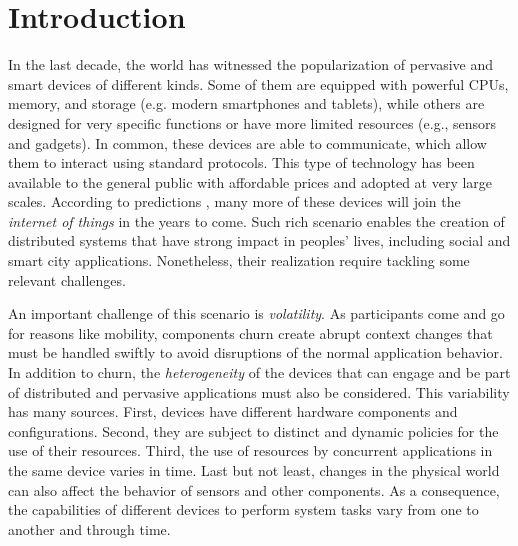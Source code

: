 \section{Introduction}
\label{sec:intro}


In the last decade, the world has witnessed the popularization of pervasive and smart devices of different kinds. Some of them are equipped with powerful CPUs, memory, and storage (e.g. modern smartphones and tablets), while others are designed for very specific functions or have more limited resources (e.g., sensors and gadgets). In common, these devices are able to communicate, which allow them to interact using standard protocols. This type of technology has been available to the general public with affordable prices and adopted at very large scales. According to predictions \cite{CITATION}, many more of these devices will join the \textit{internet of things} in the years to come. Such rich scenario enables the creation of distributed systems that have strong impact in peoples' lives, including social and smart city applications. Nonetheless, their realization require tackling some relevant challenges.


An important challenge of this scenario is \textit{volatility}. As participants come and go for reasons like mobility, components churn create abrupt context changes that must be handled swiftly to avoid disruptions of the normal application behavior. 
In addition to churn, the \textit{heterogeneity} of the devices that can engage and be part of distributed and pervasive applications must also be considered. This variability has many sources. First, devices have different hardware components and configurations. Second, they are subject to distinct and dynamic policies for the use of their resources. Third, the use of resources by concurrent applications in the same device varies in time. Last but not least, changes in the physical world %
can also affect the behavior of sensors and other components. As a consequence, the capabilities of different devices to perform system tasks vary from one to another and through time.



